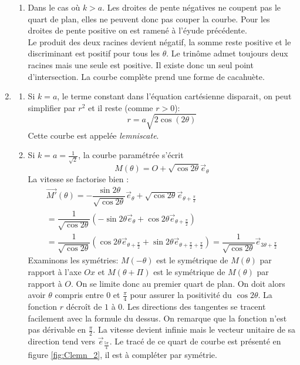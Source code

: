 \begin{enumerate}
\begin{enumerate}
\item Dans le cas où $k>a$. Les droites de pente négatives ne coupent pas le quart de plan, elles ne peuvent donc pas couper la courbe. Pour les droites de pente positive on est ramené à l'éyude précédente.\\
Le produit des deux racines devient négatif, la somme reste positive et le discriminant est positif pour tous les $\theta$. Le trinôme admet toujours deux racines mais une seule est positive. Il existe donc un seul point d'intersection. La courbe complète prend une forme de cacahuète.
\end{enumerate}

\item \begin{enumerate}
 \item Si $k=a$, le terme constant dans l'équation cartésienne disparait, on peut simplifier par $r^2$ et il reste (comme $r>0$):
\begin{displaymath}
 r=a\sqrt{2\cos(2\theta)}
\end{displaymath}
Cette courbe est appelée \emph{lemniscate}.
\item Si $k=a=\frac{1}{\sqrt{2}}$, la courbe paramétrée s'écrit
\begin{displaymath}
 M(\theta) = O + \sqrt{\cos2\theta}\overrightarrow{e}_\theta
\end{displaymath}
La vitesse se factorise bien :
\begin{multline*}
 \overrightarrow{M'}(\theta)
=-\dfrac{\sin 2\theta}{\sqrt{\cos2\theta}}\overrightarrow{e}_\theta +\sqrt{\cos2\theta}\overrightarrow{e}_{\theta +\frac{\pi}{2}}\\
=\dfrac{1}{\sqrt{\cos2\theta}}\left( -\sin 2\theta \overrightarrow{e}_\theta + \cos 2\theta\overrightarrow{e}_{\theta +\frac{\pi}{2}}\right) \\
=\dfrac{1}{\sqrt{\cos2\theta}}\left(  \cos 2\theta\overrightarrow{e}_{\theta +\frac{\pi}{2}} +\sin 2\theta \overrightarrow{e}_{\theta+\frac{\pi}{2}+\frac{\pi}{2} }\right)
= \dfrac{1}{\sqrt{\cos2\theta}}\overrightarrow{e}_{3\theta +\frac{\pi}{2}}
\end{multline*}
Examinons les symétries: $M(-\theta)$ est le symétrique de $M(\theta)$ par rapport à l'axe $Ox$ et $M(\theta +\Pi)$ est le symétrique de $M(\theta)$ par rapport à $O$.\newline
On se limite donc au premier quart de plan. On doit alors avoir $\theta$ compris entre $0$ et $\frac{\pi}{4}$ pour assurer la positivité du $\cos2\theta$. La fonction $r$ décroît de $1$ à $0$. Les directions des tangentes se tracent facilement avec la formule du dessus. On remarque que la fonction n'est pas dérivable en $\frac{\pi}{2}$. La vitesse devient infinie mais le vecteur unitaire de sa direction tend vers $\overrightarrow{e}_{\frac{5\pi}{4}}$. Le tracé de ce quart de courbe est présenté en figure \ref{fig:Clemn_2}, il est à compléter par symétrie.

\end{enumerate}
\end{enumerate}
